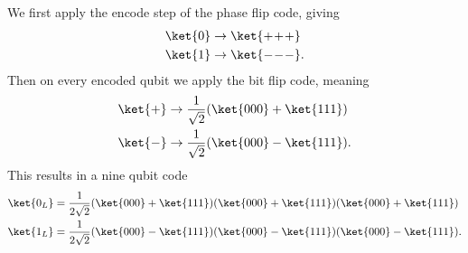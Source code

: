 \documentclass[11pt, notitlepage]{report}
\begin{document}
We first apply the encode step of the phase flip code, giving
\begin{align}
  \ket{0} &\rightarrow \ket{+\!+\!+} \\
  \ket{1} &\rightarrow \ket{-\!-\!-}.
\end{align}
Then on every encoded qubit we apply the bit flip code, meaning
\begin{align}
  \ket{+} &\rightarrow \dfrac{1}{\sqrt 2}(\ket{000} + \ket{111}) \\
  \ket{-} &\rightarrow \dfrac{1}{\sqrt 2}(\ket{000} - \ket{111}).
\end{align}
This results in a nine qubit code
\begin{align}
  \ket{0_L} &= \dfrac{1}{2\sqrt 2}(\ket{000} + \ket{111})(\ket{000} + \ket{111})(\ket{000} + \ket{111}) \\
  \ket{1_L} &= \dfrac{1}{2\sqrt 2}(\ket{000} - \ket{111})(\ket{000} - \ket{111})(\ket{000} - \ket{111}).
\end{align}
\end{document}
